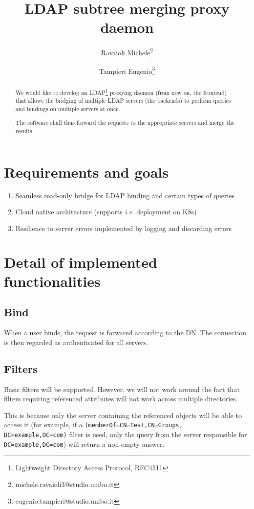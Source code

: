 \documentclass[a4paper,12pt]{article}
\title{LDAP subtree merging proxy daemon}
\author{Ravaioli Michele\thanks{michele.ravaioli3@studio.unibo.it} \and Tampieri Eugenio\thanks{eugenio.tampieri@studio.unibo.it}}
\begin{document}
    \maketitle
    \begin{abstract}
        \par We would like to develop an LDAP\footnote{Lightweight Directory Access Protocol, RFC4511}
        proxying daemon (from now on, the frontend) that allows the bridging of multiple LDAP
        servers (the backends) to perform queries and bindings on multiple servers at once. 
        \par The software shall thus forward the requests to the appropriate servers and merge
        the results.
    \end{abstract}
    \section{Requirements and goals}
        \begin{enumerate}
            \item Seamless read-only bridge for LDAP binding and certain types of queries
            \item Cloud native architecture (supports \emph{i.e.} deployment on K8s)
            \item Resilience to server errors implemented by logging and discarding errors
        \end{enumerate}
    \section{Detail of implemented functionalities}
        \subsection{Bind}
            \par When a user binds, the request is forwared according to the DN. The
            connection is then regarded as authenticated for all servers.
        \subsection{Filters}
            \par Basic filters will be supported. However, we will not work around the fact
            that filters requiring referenced attributes will not work across multiple
            directories.
            \par This is because only the server containing the referenced objects will be able
            to access it (for example, if a \texttt{(memberOf=CN=Test,CN=Groups,\\DC=example,DC=com)}
            filter is used, only the query from the server responsible for \texttt{DC=example,DC=com})
            will return a non-empty answer.
\end{document}
